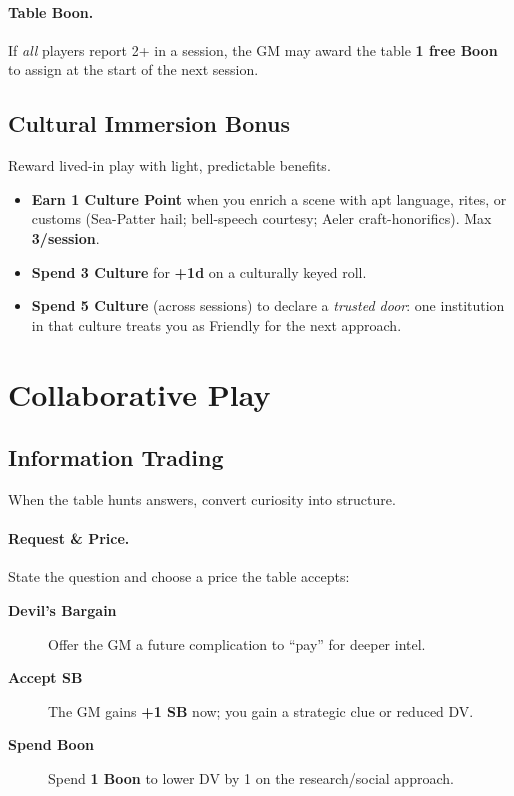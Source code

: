 \begin{multicols}{2}
\paragraph{Table Boon.} If \emph{all} players report 2+ in a session, the GM may award the table \textbf{1 free Boon} to assign at the start of the next session.

\subsection{Cultural Immersion Bonus}

Reward lived-in play with light, predictable benefits.
\begin{itemize}
  \item \textbf{Earn 1 Culture Point} when you enrich a scene with apt language, rites, or customs (Sea-Patter hail; bell-speech courtesy; Aeler craft-honorifics). Max \textbf{3/session}.%
  \item \textbf{Spend 3 Culture} for \textbf{+1d} on a culturally keyed roll.%
  \item \textbf{Spend 5 Culture} (across sessions) to declare a \emph{trusted door}: one institution in that culture treats you as Friendly for the next approach.%
\end{itemize}

\section{Collaborative Play}

\subsection{Information Trading}

When the table hunts answers, convert curiosity into structure.

\paragraph{Request \& Price.}
State the question and choose a price the table accepts:
\begin{description}
  \item[\textbf{Devil’s Bargain}] Offer the GM a future complication to “pay” for deeper intel.%
  \item[\textbf{Accept SB}] The GM gains \textbf{+1 SB} now; you gain a strategic clue or reduced DV.%
  \item[\textbf{Spend Boon}] Spend \textbf{1 Boon} to lower DV by 1 on the research/social approach.%
\end{description}


\end{multicols}
